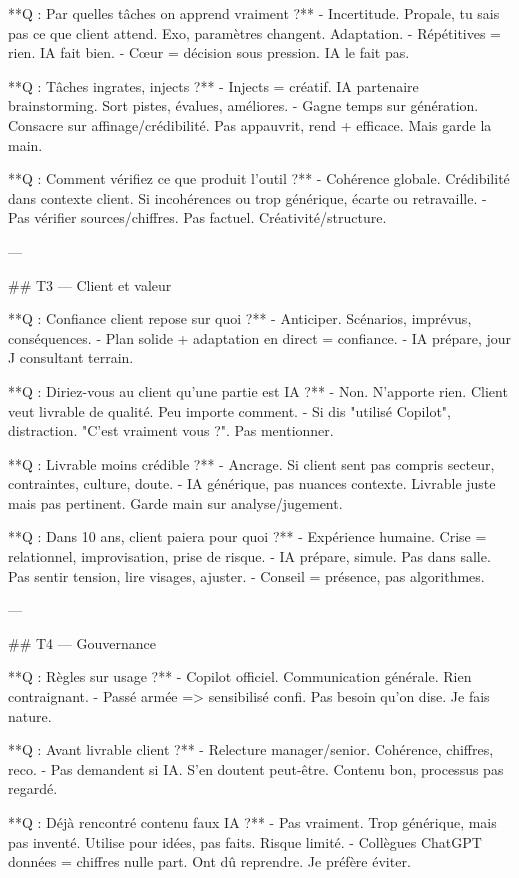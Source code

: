 **Q : Par quelles tâches on apprend vraiment ?**
- Incertitude. Propale, tu sais pas ce que client attend. Exo, paramètres changent. Adaptation.
- Répétitives = rien. IA fait bien.
- Cœur = décision sous pression. IA le fait pas.

**Q : Tâches ingrates, injects ?**
- Injects = créatif. IA partenaire brainstorming. Sort pistes, évalues, améliores.
- Gagne temps sur génération. Consacre sur affinage/crédibilité. Pas appauvrit, rend + efficace. Mais garde la main.

**Q : Comment vérifiez ce que produit l'outil ?**
- Cohérence globale. Crédibilité dans contexte client. Si incohérences ou trop générique, écarte ou retravaille.
- Pas vérifier sources/chiffres. Pas factuel. Créativité/structure.

---

## T3 — Client et valeur

**Q : Confiance client repose sur quoi ?**
- Anticiper. Scénarios, imprévus, conséquences.
- Plan solide + adaptation en direct = confiance.
- IA prépare, jour J consultant terrain.

**Q : Diriez-vous au client qu'une partie est IA ?**
- Non. N'apporte rien. Client veut livrable de qualité. Peu importe comment.
- Si dis "utilisé Copilot", distraction. "C'est vraiment vous ?". Pas mentionner.

**Q : Livrable moins crédible ?**
- Ancrage. Si client sent pas compris secteur, contraintes, culture, doute.
- IA générique, pas nuances contexte. Livrable juste mais pas pertinent. Garde main sur analyse/jugement.

**Q : Dans 10 ans, client paiera pour quoi ?**
- Expérience humaine. Crise = relationnel, improvisation, prise de risque.
- IA prépare, simule. Pas dans salle. Pas sentir tension, lire visages, ajuster.
- Conseil = présence, pas algorithmes.

---

## T4 — Gouvernance

**Q : Règles sur usage ?**
- Copilot officiel. Communication générale. Rien contraignant.
- Passé armée => sensibilisé confi. Pas besoin qu'on dise. Je fais nature.

**Q : Avant livrable client ?**
- Relecture manager/senior. Cohérence, chiffres, reco.
- Pas demandent si IA. S'en doutent peut-être. Contenu bon, processus pas regardé.

**Q : Déjà rencontré contenu faux IA ?**
- Pas vraiment. Trop générique, mais pas inventé. Utilise pour idées, pas faits. Risque limité.
- Collègues ChatGPT données = chiffres nulle part. Ont dû reprendre. Je préfère éviter.

